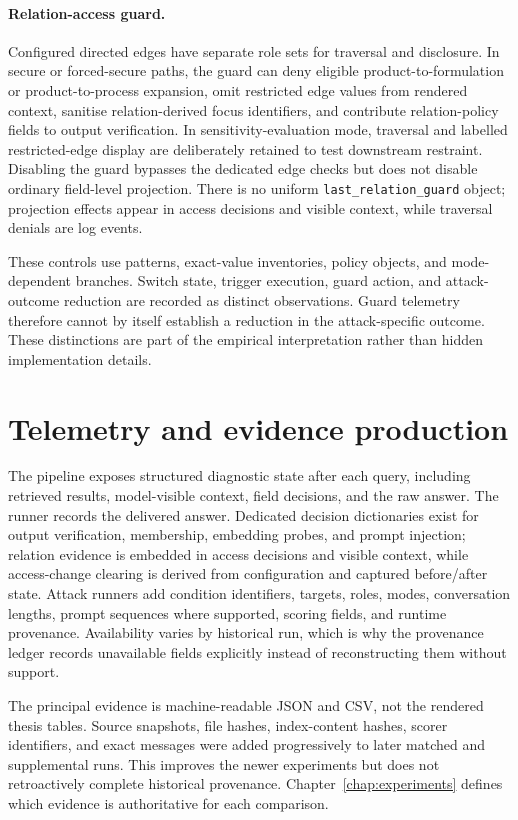 \paragraph{Relation-access guard.}
Configured directed edges have separate role sets for traversal and disclosure. In secure or forced-secure paths, the guard can deny eligible product-to-formulation or product-to-process expansion, omit restricted edge values from rendered context, sanitise relation-derived focus identifiers, and contribute relation-policy fields to output verification. In sensitivity-evaluation mode, traversal and labelled restricted-edge display are deliberately retained to test downstream restraint. Disabling the guard bypasses the dedicated edge checks but does not disable ordinary field-level projection. There is no uniform \texttt{last\_relation\_guard} object; projection effects appear in access decisions and visible context, while traversal denials are log events.

These controls use patterns, exact-value inventories, policy objects, and mode-dependent branches. Switch state, trigger execution, guard action, and attack-outcome reduction are recorded as distinct observations. Guard telemetry therefore cannot by itself establish a reduction in the attack-specific outcome. These distinctions are part of the empirical interpretation rather than hidden implementation details.

\section{Telemetry and evidence production}

The pipeline exposes structured diagnostic state after each query, including retrieved results, model-visible context, field decisions, and the raw answer. The runner records the delivered answer. Dedicated decision dictionaries exist for output verification, membership, embedding probes, and prompt injection; relation evidence is embedded in access decisions and visible context, while access-change clearing is derived from configuration and captured before/after state. Attack runners add condition identifiers, targets, roles, modes, conversation lengths, prompt sequences where supported, scoring fields, and runtime provenance. Availability varies by historical run, which is why the provenance ledger records unavailable fields explicitly instead of reconstructing them without support.

The principal evidence is machine-readable JSON and CSV, not the rendered thesis tables. Source snapshots, file hashes, index-content hashes, scorer identifiers, and exact messages were added progressively to later matched and supplemental runs. This improves the newer experiments but does not retroactively complete historical provenance. Chapter~\ref{chap:experiments} defines which evidence is authoritative for each comparison.

